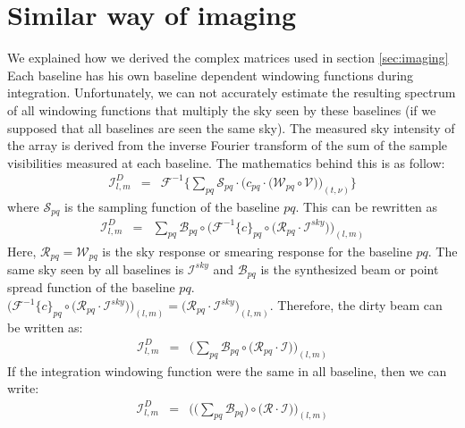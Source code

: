\documentclass[useAMS,usenatbib]{mn2e}
\begin{document}
\section[]{Similar way of imaging}
We explained how we derived the complex matrices used in section \ref{sec:imaging}
Each baseline has his own baseline dependent windowing functions during integration. Unfortunately, we can not accurately estimate the 
resulting spectrum of all windowing functions that multiply the sky seen by these baselines (if we supposed that all baselines are seen the 
same sky). The measured sky intensity of the array is derived from the inverse Fourier transform of the sum of the sample visibilities 
measured at each baseline. The mathematics behind this is as follow:
\begin{eqnarray*}
 \mathcal{I}^{D}_{l,m}&=&\mathcal{F}^{-1}\Bigg\{\sum_{pq}\mathcal{S}_{pq}\cdot \Bigg(c_{pq}\cdot\big(\mathcal{W}_{pq}\circ 
\mathcal{V}\big)\Bigg)_{(t,\nu)}\Bigg\}
\end{eqnarray*}
where $\mathcal{S}_{pq}$ is the sampling function of the baseline $pq$.  This can be rewritten as
\begin{eqnarray*}
 \mathcal{I}^{D}_{l,m}&=&\sum_{pq}\mathcal{B}_{pq}\circ \Bigg(\mathcal{F}^{-1}\big\{c\big\}_{pq}\circ\big(\mathcal{R}_{pq}\cdot
\mathcal{I}^{sky}\big)\Bigg)_{(l,m)}
\end{eqnarray*}
Here, $\mathcal{R}_{pq}=\mathcal{W}_{pq}$ is the sky response or smearing response for the baseline $pq$. The same sky seen by all 
baselines is $\mathcal{I}^{sky}$ and $\mathcal{B}_{pq}$ is the synthesized beam or point spread function of the baseline $pq$. 
$\Bigg(\mathcal{F}^{-1}\big\{c\big\}_{pq}\circ\big(\mathcal{R}_{pq}\cdot \mathcal{I}^{sky}\big)\Bigg)_{(l,m)}= 
\big(\mathcal{R}_{pq}\cdot\mathcal{I}^{sky}\big)_{(l,m)}$. Therefore, the dirty beam can be written as: 
\begin{eqnarray*}
 \mathcal{I}^{D}_{l,m}&=&\Bigg(\sum_{pq}\mathcal{B}_{pq}\circ \bigg(\mathcal{R}_{pq}\cdot
\mathcal{I}\bigg)\Bigg)_{(l,m)}
\end{eqnarray*}
If the integration windowing function were the same in all baseline, then we can write:
\begin{eqnarray*}
 \mathcal{I}^{D}_{l,m}&=&\Bigg(\bigg(\sum_{pq}\mathcal{B}_{pq}\bigg)\circ \bigg(\mathcal{R}\cdot
\mathcal{I}\bigg)\Bigg)_{(l,m)}
\end{eqnarray*}

\bsp
\label{lastpage}
\end{document}
